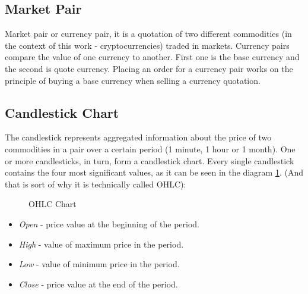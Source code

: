 \documentclass[thesis=B,english]{FITthesis}[2019/03/06]
\begin{document}
\subsection{Market Pair}
Market pair or currency pair, it is a quotation of two different commodities (in the context of this work - cryptocurrencies) traded in markets. Currency pairs compare the value of one currency to another. First one is the base currency and the second is quote currency.
Placing an order for a currency pair works on the principle of buying a base currency when selling a currency quotation.
\subsection{Candlestick Chart}
The candlestick represents aggregated information about the price of two commodities in a pair over a certain period (1 minute, 1 hour or 1 month).  One or more candlesticks, in turn, form a candlestick chart. Every single candlestick contains the four most significant values, as it can be seen in the diagram \ref{fig:OHLC}. (And that is sort of why it is technically called OHLC):
\begin{figure}[!ht]
\centering
\caption{OHLC Chart}
\label{fig:OHLC}
\end{figure}

\begin{itemize}
\item
\textit{Open} - price value at the beginning of the period.
\item
\textit{High} - value of maximum price in the period.
\item
\textit{Low} - value of minimum price in the period.
\item
\textit{Close} - price value at the end of the period.
\end{itemize}
\end{document}

